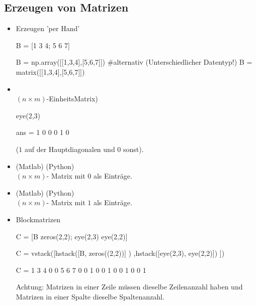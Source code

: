 \documentclass[hyperref={xetex}]{beamer}
\begin{document}
\subsection{Erzeugen von Matrizen}
%
%
\begin{frame}[fragile]{}
\begin{itemize}
\item Erzeugen 'per Hand'
\begin{matlabin}
B = [1 3 4; 5 6 7]
\end{matlabin}
\begin{pyin}
B = np.array([[1,3,4],[5,6,7]])
#alternativ (Unterschiedlicher Datentyp!)
B = matrix([[1,3,4],[5,6,7]]) 
\end{pyin}

\item {}\\ $(n \times m)$-EinheitsMatrix)
\begin{matlabin}
eye(2,3)
\end{matlabin}
\begin{matlab}
ans =
     1     0     0
     0     1     0 
\end{matlab}

($1$ auf der Hauptdiagonalen und 0 sonst).
\end{itemize}
\end{frame} 
%
%
\begin{frame}[fragile]{}
\begin{itemize}
\item {}(Matlab) (Python) \\$(n \times m)$- Matrix mit $0$ als Einträge.
\item {}(Matlab) (Python)\\$(n \times m)$- Matrix mit $1$ als Einträge.
\item Blockmatrizen
\begin{matlabin}
C = [B zeros(2,2); eye(2,3) eye(2,2)]
\end{matlabin}
\begin{pyin}
C = vstack([hstack([B, zeros((2,2))] ) ,hstack([eye(2,3), eye(2,2)]) ])
\end{pyin}
\begin{matlab}
C =
     1     3     4     0     0
     5     6     7     0     0
     1     0     0     1     0
     0     1     0     0     1 
\end{matlab}

\alert{Achtung:} Matrizen in einer Zeile müssen dieselbe
Zeilenanzahl haben und Matrizen in einer Spalte dieselbe Spaltenanzahl.
\end{itemize}
\end{frame} 
\end{document}
